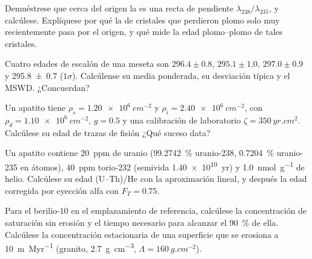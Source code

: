 \begin{exercise}[$\star\star$]\label{exo:b3:advanced-geochronology:5}
Demuéstrese que cerca del origen la  es una recta de pendiente
$\lambda_{238}/\lambda_{235}$, y calcúlese. Explíquese por qué la  de
cristales que perdieron plomo solo muy recientemente pasa por el origen, y
qué mide la edad plomo--plomo de tales cristales.
\end{exercise}

\begin{exercise}[$\star\star$]\label{exo:b3:advanced-geochronology:6}
Cuatro edades de escalón de una meseta son $296.4 \pm 0.8$, $295.1 \pm 1.0$, $297.0 \pm
0.9$ y \qty[separate-uncertainty=true]{295.8 \pm 0.7}{\Ma} ($1\sigma$). Calcúlense su media ponderada,
su desviación típica y el MSWD. ¿Concuerdan?
\end{exercise}

\begin{exercise}[$\star\star$]\label{exo:b3:advanced-geochronology:7}
Un apatito tiene $\rho_s = \qty{1.20e6}{cm^{-2}}$ y $\rho_i =
\qty{2.40e6}{cm^{-2}}$, con $\rho_d = \qty{1.10e6}{cm^{-2}}$, $g = 0.5$ y una
calibración de laboratorio $\zeta = \qty{350}{yr.cm^2}$. Calcúlese su edad de trazas de fisión
¿Qué suceso data?
\end{exercise}

\begin{exercise}[$\star\star$]\label{exo:b3:advanced-geochronology:8}
Un apatito contiene \qty{20}{ppm} de uranio (\qty{99.2742}{\percent}
uranio-238, \qty{0.7204}{\percent} uranio-235 en átomos), \qty{40}{ppm}
torio-232 (semivida \qty{1.40e10}{yr}) y \qty{1.0}{nmol.g^{-1}} de helio.
Calcúlese su edad (U--Th)/He con la aproximación lineal, y después la edad
corregida por eyección alfa con $F_T = 0.75$.
\end{exercise}

\begin{exercise}[$\star\star$]\label{exo:b3:advanced-geochronology:9}
Para el berilio-10 en el emplazamiento de referencia, calcúlese la concentración de saturación
sin erosión y el tiempo necesario para alcanzar el \qty{90}{\percent} de ella. Calcúlese la
concentración estacionaria de una superficie que se erosiona a \qty{10}{m.Myr^{-1}} (granito,
\qty{2.7}{g.cm^{-3}}, $\Lambda = \qty{160}{g.cm^{-2}}$).
\end{exercise}

